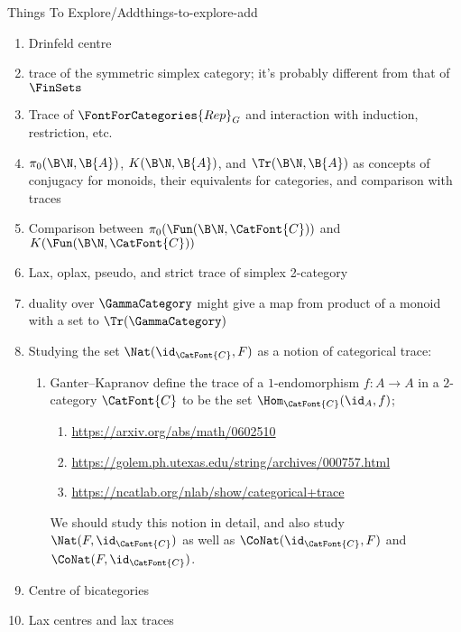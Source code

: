 \begin{remark}{Things To Explore/Add}{things-to-explore-add}
\begin{enumerate}
\begin{align*}
                \{0,1,2,3,\ldots\} &\mapsto \{0,0,1,2,\ldots\},\\
                \{0,1,2,3,\ldots\} &\mapsto \{2,3,4,5,\ldots\}.
            \end{align*}
            Show also that if $c\in[1_{A}]$, then $c$ is idempotent.
        \item Drinfeld centre
        \item trace of the symmetric simplex category; it's probably different from that of $\FinSets$
        \item Trace of $\FontForCategories{Rep}_{G}$ and interaction with induction, restriction, etc.
        \item $\pi_{0}(\B\N,\B{A})$, $K(\B\N,\B{A})$, and $\Tr(\B\N,\B{A})$ as concepts of conjugacy for monoids, their equivalents for categories, and comparison with traces
        \item Comparison between $\pi_{0}(\Fun(\B\N,\CatFont{C}))$ and $K(\Fun(\B\N,\CatFont{C}))$
        \item Lax, oplax, pseudo, and strict trace of simplex 2-category
        \item duality over $\GammaCategory$ might give a map from product of a monoid with a set to $\Tr(\GammaCategory)$
        \item Studying the set $\Nat(\id_{\CatFont{C}},F)$ as a notion of categorical trace:
            \begin{enumerate}
                \item Ganter–Kapranov define the trace of a $1$-endomorphism $f\colon A\to A$ in a $2$-category $\CatFont{C}$ to be the set $\Hom_{\CatFont{C}}(\id_{A},f)$;
                    \begin{enumerate}
                        \item \url{https://arxiv.org/abs/math/0602510}
                        \item \url{https://golem.ph.utexas.edu/string/archives/000757.html}
                        \item \url{https://ncatlab.org/nlab/show/categorical+trace}
                    \end{enumerate}
                    We should study this notion in detail, and also study $\Nat(F,\id_{\CatFont{C}})$ as well as $\CoNat(\id_{\CatFont{C}},F)$ and $\CoNat(F,\id_{\CatFont{C}})$.
            \end{enumerate}
        \item Centre of bicategories
        \item Lax centres and lax traces

\end{enumerate}
\end{remark}
